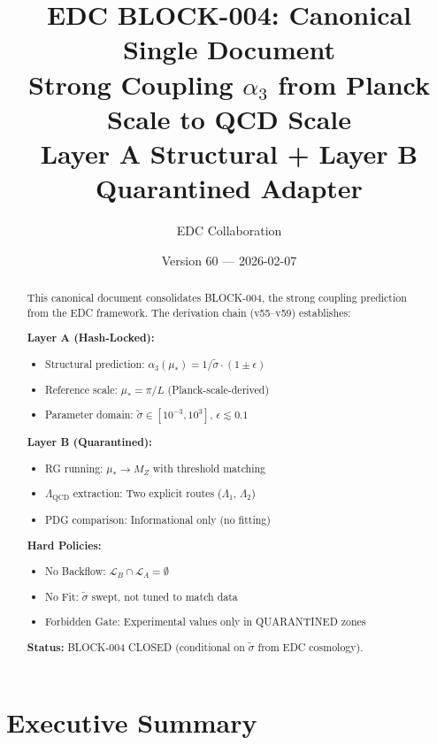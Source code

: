 \documentclass[11pt,a4paper]{article}
\title{%
  \textbf{EDC BLOCK-004: Canonical Single Document}\\[0.5em]
  \Large Strong Coupling $\alpha_3$ from Planck Scale to QCD Scale\\[0.3em]
  \large Layer A Structural + Layer B Quarantined Adapter
}
\author{EDC Collaboration}
\date{Version 60 --- 2026-02-07}
\theoremstyle{definition}
\begin{document}
\maketitle

\begin{abstract}
This canonical document consolidates BLOCK-004, the strong coupling prediction
from the EDC framework. The derivation chain (v55--v59) establishes:

\textbf{Layer A (Hash-Locked):}
\begin{itemize}
  \item Structural prediction: $\alpha_3(\mu_*) = 1/\tilde{\sigma} \cdot (1 \pm \epsilon)$
  \item Reference scale: $\mu_* = \pi/L$ (Planck-scale-derived)
  \item Parameter domain: $\tilde{\sigma} \in [10^{-3}, 10^3]$, $\epsilon \lesssim 0.1$
\end{itemize}

\textbf{Layer B (Quarantined):}
\begin{itemize}
  \item RG running: $\mu_* \to M_Z$ with threshold matching
  \item $\Lambda_{\text{QCD}}$ extraction: Two explicit routes ($\Lambda_1$, $\Lambda_2$)
  \item PDG comparison: Informational only (no fitting)
\end{itemize}

\textbf{Hard Policies:}
\begin{itemize}
  \item No Backflow: $\mathcal{L}_B \cap \mathcal{L}_A = \emptyset$
  \item No Fit: $\tilde{\sigma}$ swept, not tuned to match data
  \item Forbidden Gate: Experimental values only in QUARANTINED zones
\end{itemize}

\textbf{Status:} BLOCK-004 CLOSED (conditional on $\tilde{\sigma}$ from EDC cosmology).
\end{abstract}

\tableofcontents
\newpage

\section{Executive Summary}
\label{sec:executive}
\end{document}
